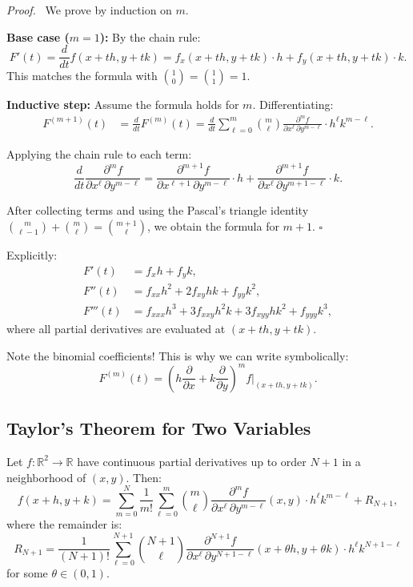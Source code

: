 \documentclass[11pt]{report}
\renewenvironment{proof}[1][Proof]{\par\noindent\textit{#1.}\ }{\hfill$\square$\par\medskip}
\newcommand{\R}{\mathbb{R}}
\begin{document}
\begin{proof}
We prove by induction on $m$.

\textbf{Base case ($m = 1$):} By the chain rule:
\[
F'(t) = \frac{d}{dt} f(x + th, y + tk) = f_x(x + th, y + tk) \cdot h + f_y(x + th, y + tk) \cdot k.
\]
This matches the formula with $\binom{1}{0} = \binom{1}{1} = 1$.

\textbf{Inductive step:} Assume the formula holds for $m$. Differentiating:
\begin{align*}
F^{(m+1)}(t) &= \frac{d}{dt} F^{(m)}(t) = \frac{d}{dt} \sum_{\ell=0}^{m} \binom{m}{\ell} \frac{\partial^m f}{\partial x^\ell \, \partial y^{m-\ell}} \cdot h^\ell k^{m-\ell}.
\end{align*}

Applying the chain rule to each term:
\[
\frac{d}{dt} \frac{\partial^m f}{\partial x^\ell \, \partial y^{m-\ell}} = \frac{\partial^{m+1} f}{\partial x^{\ell+1} \, \partial y^{m-\ell}} \cdot h + \frac{\partial^{m+1} f}{\partial x^\ell \, \partial y^{m+1-\ell}} \cdot k.
\]

After collecting terms and using the Pascal's triangle identity $\binom{m}{\ell-1} + \binom{m}{\ell} = \binom{m+1}{\ell}$, we obtain the formula for $m + 1$.
\end{proof}

\begin{remark}
Explicitly:
\begin{align*}
F'(t) &= f_x h + f_y k, \\[4pt]
F''(t) &= f_{xx} h^2 + 2f_{xy} hk + f_{yy} k^2, \\[4pt]
F'''(t) &= f_{xxx} h^3 + 3f_{xxy} h^2 k + 3f_{xyy} hk^2 + f_{yyy} k^3,
\end{align*}
where all partial derivatives are evaluated at $(x + th, y + tk)$.

Note the binomial coefficients! This is why we can write symbolically:
\[
F^{(m)}(t) = \left( h \frac{\partial}{\partial x} + k \frac{\partial}{\partial y} \right)^m f \bigg|_{(x+th, y+tk)}.
\]
\end{remark}

\subsection{Taylor's Theorem for Two Variables}

\begin{theorem}
Let $f : \R^2 \to \R$ have continuous partial derivatives up to order $N + 1$ in a neighborhood of $(x, y)$. Then:
\[
f(x + h, y + k) = \sum_{m=0}^{N} \frac{1}{m!} \sum_{\ell=0}^{m} \binom{m}{\ell} \frac{\partial^m f}{\partial x^\ell \, \partial y^{m-\ell}}(x, y) \cdot h^\ell k^{m-\ell} + R_{N+1},
\]
where the remainder is:
\[
R_{N+1} = \frac{1}{(N+1)!} \sum_{\ell=0}^{N+1} \binom{N+1}{\ell} \frac{\partial^{N+1} f}{\partial x^\ell \, \partial y^{N+1-\ell}}(x + \theta h, y + \theta k) \cdot h^\ell k^{N+1-\ell}
\]
for some $\theta \in (0, 1)$.
\end{theorem}
\end{document}
